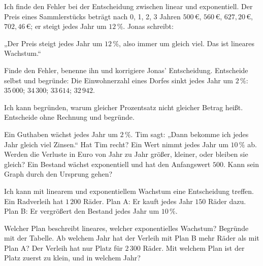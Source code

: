 \begin{aufgabe}{Ich finde den Fehler bei der Entscheidung zwischen linear und exponentiell. Der Preis eines Sammlerstücks beträgt nach 0, 1, 2, 3 Jahren $500\,€$, $560\,€$, $627{,}20\,€$, $702{,}46\,€$; er steigt jedes Jahr um $12\,\%$. Jonas schreibt:}
\par\hspace{1.6em}\parbox{0.9\linewidth}{„Der Preis steigt jedes Jahr um $12\,\%$, also immer um gleich viel. Das ist lineares Wachstum.“}\par
\begin{teile}
\teil Finde den Fehler, benenne ihn und korrigiere Jonas' Entscheidung.
\teil Entscheide selbst und begründe: Die Einwohnerzahl eines Dorfes sinkt jedes Jahr um $2\,\%$: $35\,000$; $34\,300$; $33\,614$; $32\,942$. \hfill {}
\end{teile}
\end{aufgabe}

\begin{aufgabe}{Ich kann begründen, warum gleicher Prozentsatz nicht gleicher Betrag heißt. Entscheide ohne Rechnung und begründe.}
\begin{teile}
\teil Ein Guthaben wächst jedes Jahr um $2\,\%$. Tim sagt: „Dann bekomme ich jedes Jahr gleich viel Zinsen.“ Hat Tim recht?
\teil Ein Wert nimmt jedes Jahr um $10\,\%$ ab. Werden die Verluste in Euro von Jahr zu Jahr größer, kleiner, oder bleiben sie gleich?
\teil Ein Bestand wächst exponentiell und hat den Anfangswert $500$. Kann sein Graph durch den Ursprung gehen?
\end{teile}
\end{aufgabe}

\begin{aufgabe}{Ich kann mit linearem und exponentiellem Wachstum eine Entscheidung treffen. Ein Radverleih hat $1\,200$ Räder. Plan A: Er kauft jedes Jahr $150$ Räder dazu. Plan B: Er vergrößert den Bestand jedes Jahr um $10\,\%$.}
\begin{teile}
\teil Welcher Plan beschreibt lineares, welcher exponentielles Wachstum? Begründe mit der Tabelle.
\teil Ab welchem Jahr hat der Verleih mit Plan B mehr Räder als mit Plan A?
\teil Der Verleih hat nur Platz für $2\,300$ Räder. Mit welchem Plan ist der Platz zuerst zu klein, und in welchem Jahr?
\end{teile}
\end{aufgabe}

